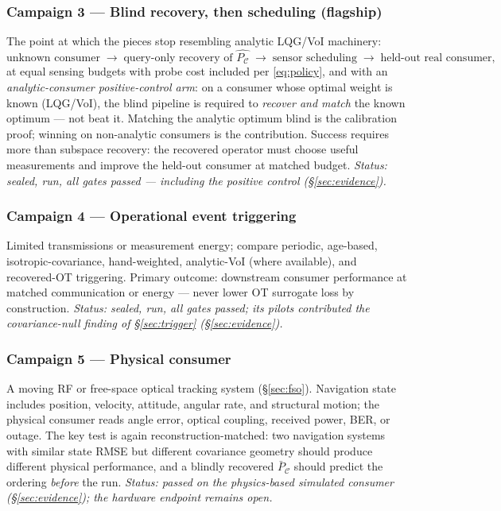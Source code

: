 \documentclass{article}
\theoremstyle{definition}
\theoremstyle{remark}
\newcommand{\PC}{P_{\mathcal{C}}}
\newcommand{\PCb}{\bar P_{\mathcal{C}}}
\begin{document}
\subsubsection*{Campaign 3 --- Blind recovery, then scheduling (flagship)}
The point at which the pieces stop resembling analytic LQG/VoI machinery:
\begin{equation*}
\text{unknown consumer}\;\to\;\text{query-only recovery of }\widehat{\PC}
\;\to\;\text{sensor scheduling}\;\to\;\text{held-out real consumer},
\end{equation*}
at equal sensing budgets with probe cost included per \eqref{eq:policy}, and
with an \emph{analytic-consumer positive-control arm}: on a consumer whose
optimal weight is known (LQG/VoI), the blind pipeline is required to
\emph{recover and match} the known optimum --- not beat it. Matching the
analytic optimum blind is the calibration proof; winning on non-analytic
consumers is the contribution. Success requires more than subspace recovery:
the recovered operator must choose useful measurements and improve the
held-out consumer at matched budget.
\emph{Status: sealed, run, all gates passed --- including the positive
control (\S\ref{sec:evidence}).}

\subsubsection*{Campaign 4 --- Operational event triggering}
Limited transmissions or measurement energy; compare periodic, age-based,
isotropic-covariance, hand-weighted, analytic-VoI (where available), and
recovered-OT triggering. Primary outcome: downstream consumer performance at
matched communication or energy --- never lower OT surrogate loss by
construction.
\emph{Status: sealed, run, all gates passed; its pilots contributed the
covariance-null finding of \S\ref{sec:trigger} (\S\ref{sec:evidence}).}

\subsubsection*{Campaign 5 --- Physical consumer}
A moving RF or free-space optical tracking system (\S\ref{sec:fso}).
Navigation state includes position, velocity, attitude, angular rate, and
structural motion; the physical consumer reads angle error, optical coupling,
received power, BER, or outage. The key test is again reconstruction-matched:
two navigation systems with similar state RMSE but different covariance
geometry should produce different physical performance, and a blindly
recovered $\PCb$ should predict the ordering \emph{before} the run.
\emph{Status: passed on the physics-based simulated consumer
(\S\ref{sec:evidence}); the hardware endpoint remains open.}
\end{document}
